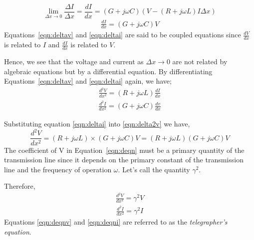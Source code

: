 


\[ \lim_{ \Delta x\to 0}\frac{ \Delta I}{ \Delta x} = \frac{dI}{dx} =  (G + j\omega C)(V -(R + j\omega L)I\Delta x) \]
\begin{align}
\frac{dI}{dx} = (G + j\omega C)V 
\label{eqn:deltai}
\end{align}
Equations~\eqref{eqn:deltav} and \eqref{eqn:deltai} are said to be coupled equations since $ \frac{dV}{dx} $ is related to $I$ and $ \frac{dI}{dx} $  is related to $V$.

Hence, we see that the voltage and current as $\Delta x \rightarrow 0$ are not related by algebraic equations but by a differential equation. By differentiating Equations~\eqref{eqn:deltav} and \eqref{eqn:deltai} again, we have; 
\begin{align}
\frac{d^{2}V}{dx^{2}} =  (R + j\omega L)\frac{dI}{dx} 
\label{eqn:delta2v}
\end{align}
\begin{align}
\frac{d^{2}I}{dx^{2}} =  (G + j\omega C)\frac{dv}{dx}
\label{eqn:delta2i}
\end{align}

Substituting equation \eqref{eqn:deltai} into \eqref{eqn:delta2v} we have,
\begin{dmath}
\frac{d^{2}V}{dx^{2}} =  (R + j\omega L)\times (G + j\omega C)V = (R + j\omega L)(G + j\omega C)V 
\label{eqn:deqn}
\end{dmath}   
The coefficient of V in Equation~\ref{eqn:deqn} must be a primary quantity of the transmission line since it depends on the primary constant of the transmission line and the frequency of operation $ \omega$. Let's call the quantity $ \gamma^{2}$.

Therefore, 
\begin{align}
\frac{d^{2}V}{dx^{2}} = \gamma^{2}V 
\label{eqn:deqnv}
\end{align}
\begin{align}
\frac{d^{2}I}{dx^{2}} = \gamma^{2}I 
\label{eqn:deqni}
\end{align}
Equations \ref{eqn:deqnv} and \ref{eqn:deqni} are referred to as the \emph{telegrapher's equation}.

